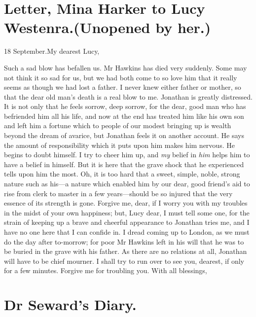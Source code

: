 \section{Letter, Mina Harker to Lucy Westenra.(Unopened by her.)}


\begin{mail}{18 September.}{My dearest Lucy,}

Such a sad blow has befallen us. Mr Hawkins has died very suddenly. Some may not think it so sad for us, but we had both come to so love him that it really seems as though we had lost a father. I never knew either father or mother, so that the dear old man's death is a real blow to me. Jonathan is greatly distressed. It is not only that he feels sorrow, deep sorrow, for the dear, good man who has befriended him all his life, and now at the end has treated him like his own son and left him a fortune which to people of our modest bringing up is wealth beyond the dream of avarice, but Jonathan feels it on another account. He says the amount of responsibility which it puts upon him makes him nervous. He begins to doubt himself. I try to cheer him up, and \textit{my} belief in \textit{him} helps him to have a belief in himself. But it is here that the grave shock that he experienced tells upon him the most. Oh, it is too hard that a sweet, simple, noble, strong nature such as his—a nature which enabled him by our dear, good friend's aid to rise from clerk to master in a few years—should be so injured that the very essence of its strength is gone. Forgive me, dear, if I worry you with my troubles in the midst of your own happiness; but, Lucy dear, I must tell some one, for the strain of keeping up a brave and cheerful appearance to Jonathan tries me, and I have no one here that I can confide in. I dread coming up to London, as we must do the day after to-morrow; for poor Mr Hawkins left in his will that he was to be buried in the grave with his father. As there are no relations at all, Jonathan will have to be chief mourner. I shall try to run over to see you, dearest, if only for a few minutes. Forgive me for troubling you. With all blessings,

\end{mail}

\section{Dr Seward's Diary.}

